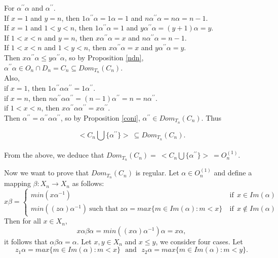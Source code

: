 \documentclass[10pt]{extarticle}
\numberwithin{equation}{section}
\numberwithin{bbb}{section}
\numberwithin{equation}{section}
\begin{document}
\vspace{0.3cm}
For $\alpha^{\prime\prime}\alpha$ and $\alpha^{\prime\prime}$.\\
If $x=1$ and $y=n$, then $1\alpha^{\prime\prime}\alpha=1\alpha=1$ and $n\alpha^{\prime\prime}\alpha=n\alpha=n-1$.\\
If $x=1$ and $1<y<n$, then $1\alpha^{\prime\prime}\alpha=1$ and $y\alpha^{\prime\prime}\alpha=(y+1)\alpha=y$.\\
If $1<x<n$ and $y=n$, then $x\alpha^{\prime\prime}\alpha=x$ and $n\alpha^{\prime\prime}\alpha=n-1$.\\
If $1<x<n$ and $1<y<n$, then $x\alpha^{\prime\prime}\alpha=x$ and $y\alpha^{\prime\prime}\alpha=y$.\\
Then $x\alpha^{\prime\prime}\alpha \leq y\alpha^{\prime\prime}\alpha$, so by Proposition \ref{ndn}, $\alpha^{\prime\prime}\alpha \in O_n \cap D_n= C_n \subseteq Dom_{T_{n}}(C_n)$.\\
Also,\\
if $x=1$, then $1\alpha^{\prime\prime}\alpha\alpha^{\prime\prime}=1\alpha^{\prime\prime}$.\\
if $x=n$, then 
$n\alpha^{\prime\prime}\alpha\alpha^{\prime\prime}=(n-1)\alpha^{\prime\prime}=n=n\alpha^{\prime\prime}$.\\
if $1<x<n$, then 
$x\alpha^{\prime\prime}\alpha\alpha^{\prime\prime}=x\alpha^{\prime\prime}$.\\
Then $\alpha^{\prime\prime}=\alpha^{\prime\prime}\alpha\alpha^{\prime\prime}$, so by Proposition \ref{coni}, $\alpha^{\prime\prime}\in Dom_{T_{n}}(C_n)$. Thus 

$$<C_n \bigcup \{{\alpha^{\prime\prime}}\}> \ \subseteq Dom_{T_{n}}(C_n).$$\\[10pt]
From the above, we deduce that $Dom_{T_n}(C_n)= \ <C_n \bigcup \{{\alpha^{\prime\prime}}\}> \ =O_{n}^{(1)}$.


Now we want to prove that $Dom_{T_{n}}(C_n)$ is regular. Let $\alpha \in O^{(1)}_n$ and define a mapping $\beta:X_n \rightarrow X_n$ as follows:  
    \begin{equation*}
    x\beta= \begin{cases}
     min(x\alpha^{-1}) & \text{if} \ \ x\in Im(\alpha) \\
    min((z\alpha)\alpha^{-1}) \ \text{such that} \ z\alpha=max\{m \in Im(\alpha): m < x\}\ & \text{if} \ \ x\notin Im(\alpha)
    \end{cases}
\end{equation*}
Then for all $x \in X_n$,
$$x\alpha\beta\alpha=min((x\alpha)\alpha^{-1})\alpha=x\alpha,$$
it follows that $\alpha\beta\alpha=\alpha$. Let $x,y \in X_n$ and $x \leq y$, we consider four cases.  Let
  $$ z_1\alpha=max\{m \in Im(\alpha): m<x\} \ \ \ \text{and} \ \ \ z_2\alpha=max\{m \in Im(\alpha): m<y\}.$$
\end{document}
